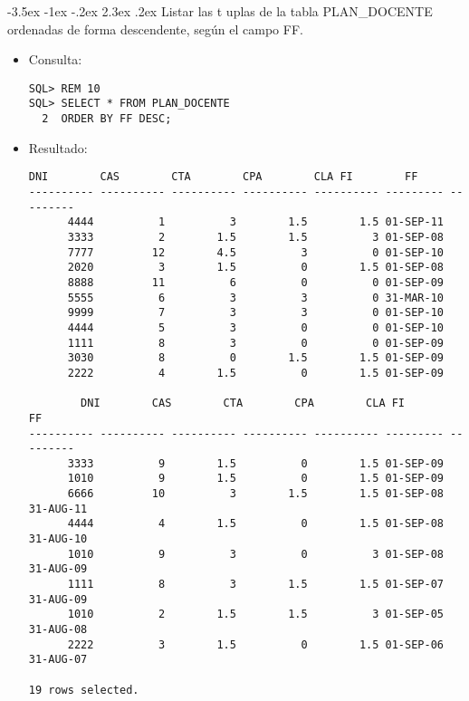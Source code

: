 \documentclass[11pt]{report}
\makeatletter
\renewcommand\chapter{\@startsection{chapter}{0}{\z@}%
    {-3.5ex \@plus -1ex \@minus -.2ex}%
    {2.3ex \@plus.2ex}%
    {\normalfont\Large\bfseries}}
\makeatother
\begin{document}
\chapter{Listar las t uplas de la tabla PLAN\_DOCENTE ordenadas de forma descendente, según el campo FF.}
\begin{itemize}
  \item Consulta:
  \begin{verbatim}
SQL> REM 10
SQL> SELECT * FROM PLAN_DOCENTE
  2  ORDER BY FF DESC;
  \end{verbatim}
  \item{Resultado:}
  \begin{verbatim}
DNI        CAS        CTA        CPA        CLA FI        FF             
---------- ---------- ---------- ---------- ---------- --------- ---------      
      4444          1          3        1.5        1.5 01-SEP-11                
      3333          2        1.5        1.5          3 01-SEP-08                
      7777         12        4.5          3          0 01-SEP-10                
      2020          3        1.5          0        1.5 01-SEP-08                
      8888         11          6          0          0 01-SEP-09                
      5555          6          3          3          0 31-MAR-10                
      9999          7          3          3          0 01-SEP-10                
      4444          5          3          0          0 01-SEP-10                
      1111          8          3          0          0 01-SEP-09                
      3030          8          0        1.5        1.5 01-SEP-09                
      2222          4        1.5          0        1.5 01-SEP-09                

        DNI        CAS        CTA        CPA        CLA FI        FF             
---------- ---------- ---------- ---------- ---------- --------- ---------      
      3333          9        1.5          0        1.5 01-SEP-09                
      1010          9        1.5          0        1.5 01-SEP-09                
      6666         10          3        1.5        1.5 01-SEP-08 31-AUG-11      
      4444          4        1.5          0        1.5 01-SEP-08 31-AUG-10      
      1010          9          3          0          3 01-SEP-08 31-AUG-09      
      1111          8          3        1.5        1.5 01-SEP-07 31-AUG-09      
      1010          2        1.5        1.5          3 01-SEP-05 31-AUG-08      
      2222          3        1.5          0        1.5 01-SEP-06 31-AUG-07      

19 rows selected.
  \end{verbatim}
\end{itemize}
\end{document}
